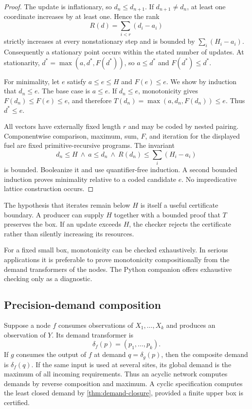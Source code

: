 \begin{proof}
The update is inflationary, so $d_n\leq d_{n+1}$.  If $d_{n+1}\neq d_n$, at least one coordinate increases by at least one.  Hence the rank
\[
  R(d)=\sum_{i<r}(d_i-a_i)
\]
strictly increases at every nonstationary step and is bounded by
$\sum_i(H_i-a_i)$.  Consequently a stationary point occurs within the stated number of updates.  At stationarity,
$d^*=\max(a,d^*,F(d^*))$, so $a\leq d^*$ and $F(d^*)\leq d^*$.

For minimality, let $e$ satisfy $a\leq e\leq H$ and $F(e)\leq e$.  We show by induction that $d_n\leq e$.  The base case is $a\leq e$.  If $d_n\leq e$, monotonicity gives $F(d_n)\leq F(e)\leq e$, and therefore
$T(d_n)=\max(a,d_n,F(d_n))\leq e$.  Thus $d^*\leq e$.

All vectors have externally fixed length $r$ and may be coded by nested pairing.  Componentwise comparison, maximum, sum, $F$, and iteration for the displayed fuel are fixed primitive-recursive programs.  The invariant
\[
 d_n\leq H\ \wedge\ a\leq d_n\ \wedge\
 R(d_n)\leq \sum_i(H_i-a_i)
\]
is bounded.  Booleanize it and use quantifier-free induction.  A second bounded induction proves minimality relative to a coded candidate $e$.  No impredicative lattice construction occurs.
\end{proof}

The hypothesis that iterates remain below $H$ is itself a useful certificate boundary.  A producer can supply $H$ together with a bounded proof that $T$ preserves the box.  If an update exceeds $H$, the checker rejects the certificate rather than silently increasing its resources.

\begin{remark}
For a fixed small box, monotonicity can be checked exhaustively.  In serious applications it is preferable to prove monotonicity compositionally from the demand transformers of the nodes.  The Python companion offers exhaustive checking only as a diagnostic.
\end{remark}

\subsection{Precision-demand composition}

Suppose a node $f$ consumes observations of $X_1,\ldots,X_k$ and produces an observation of $Y$.  Its demand transformer is
\[
  \delta_f(p)=(p_1,\ldots,p_k).
\]
If $g$ consumes the output of $f$ at demand $q=\delta_g(p)$, then the composite demand is
$\delta_f(q)$.  If the same input is used at several sites, its global demand is the maximum of all incoming requirements.  Thus an acyclic network computes demands by reverse composition and maximum.  A cyclic specification computes the least closed demand by \cref{thm:demand-closure}, provided a finite upper box is certified.

